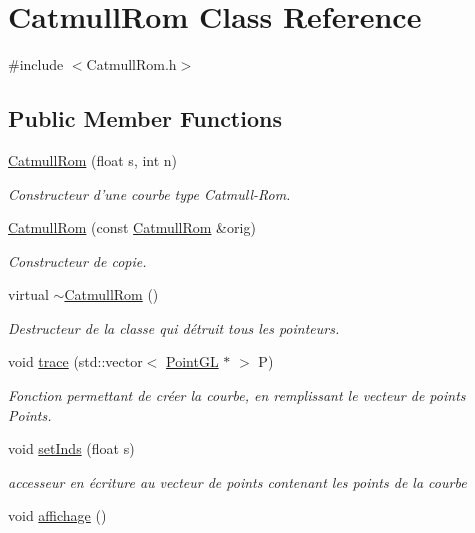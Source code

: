 \hypertarget{classCatmullRom}{\section{Catmull\-Rom Class Reference}
\label{classCatmullRom}
}


{\ttfamily \#include $<$Catmull\-Rom.\-h$>$}

\subsection*{Public Member Functions}
\begin{DoxyCompactItemize}
\item 
\hyperlink{classCatmullRom_ac0e994d7a9644541cf02e8fd82fa0773}{Catmull\-Rom} (float s, int n)
\begin{DoxyCompactList}\small\item\em Constructeur d'une courbe type Catmull-\/\-Rom. \end{DoxyCompactList}\item 
\hypertarget{classCatmullRom_a1acf3961c850ce0f7911b64db3463629}{\hyperlink{classCatmullRom_a1acf3961c850ce0f7911b64db3463629}{Catmull\-Rom} (const \hyperlink{classCatmullRom}{Catmull\-Rom} \&orig)}\label{classCatmullRom_a1acf3961c850ce0f7911b64db3463629}

\begin{DoxyCompactList}\small\item\em Constructeur de copie. \end{DoxyCompactList}\item 
\hypertarget{classCatmullRom_a5661b43985801f9adf5047f057b55ddc}{virtual \hyperlink{classCatmullRom_a5661b43985801f9adf5047f057b55ddc}{$\sim$\-Catmull\-Rom} ()}\label{classCatmullRom_a5661b43985801f9adf5047f057b55ddc}

\begin{DoxyCompactList}\small\item\em Destructeur de la classe qui détruit tous les pointeurs. \end{DoxyCompactList}\item 
void \hyperlink{classCatmullRom_a2be4505724c40d8bc7d7d72164ab5585}{trace} (std\-::vector$<$ \hyperlink{classPointGL}{Point\-G\-L} $\ast$ $>$ P)
\begin{DoxyCompactList}\small\item\em Fonction permettant de créer la courbe, en remplissant le vecteur de points Points. \end{DoxyCompactList}\item 
void \hyperlink{classCatmullRom_ac70e97a3222e3883d1df1c74ede347a8}{set\-Inds} (float s)
\begin{DoxyCompactList}\small\item\em accesseur en écriture au vecteur de points contenant les points de la courbe \end{DoxyCompactList}\item 
\hypertarget{classCatmullRom_a9d20a2042b439a8d129481185f5c57fa}{void \hyperlink{classCatmullRom_a9d20a2042b439a8d129481185f5c57fa}{affichage} ()}\label{classCatmullRom_a9d20a2042b439a8d129481185f5c57fa}


\end{DoxyCompactItemize}
